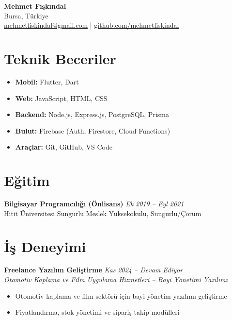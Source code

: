 \documentclass[11pt,a4paper]{article}
\begin{document}
\begin{center}
{\LARGE\bfseries Mehmet Fışkındal}\\[4pt]
{\normalsize Bursa, Türkiye}\\[2pt]
{\small\href{mailto:mehmetfiskindal@gmail.com}{mehmetfiskindal@gmail.com} \quad | \quad \href{https://github.com/mehmetfiskindal}{github.com/mehmetfiskindal}}
\end{center}

\vspace{6pt}

\section{Teknik Beceriler}
\begin{itemize}[leftmargin=*, nosep]
\item \textbf{Mobil:} Flutter, Dart
\item \textbf{Web:} JavaScript, HTML, CSS
\item \textbf{Backend:} Node.js, Express.js, PostgreSQL, Prisma
\item \textbf{Bulut:} Firebase (Auth, Firestore, Cloud Functions)
\item \textbf{Araçlar:} Git, GitHub, VS Code
\end{itemize}

\vspace{2pt}

\section{Eğitim}
\textbf{Bilgisayar Programcılığı (Önlisans)} \hfill \textit{Ek 2019 – Eyl 2021}\\
Hitit Üniversitesi Sungurlu Meslek Yüksekokulu, Sungurlu/Çorum

\vspace{2pt}

\section{İş Deneyimi}
\textbf{Freelance Yazılım Geliştirme} \hfill \textit{Kas 2024 – Devam Ediyor}\\
\textit{Otomotiv Kaplama ve Film Uygulama Hizmetleri -- Bayi Yönetimi Yazılımı}\\[2pt]
\begin{itemize}[leftmargin=*, nosep]
\item Otomotiv kaplama ve film sektörü için bayi yönetim yazılımı geliştirme
\item Fiyatlandırma, stok yönetimi ve sipariş takip modülleri
\end{itemize}
\end{document}

